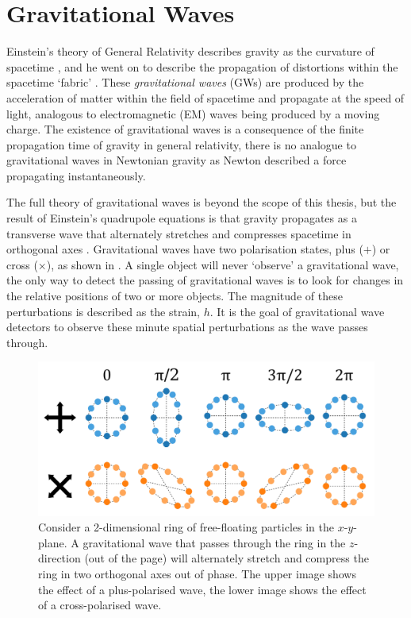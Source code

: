 \section{Gravitational Waves}
\label{sec:gw}
\begin{colsection}


\begin{colsection}

Einstein's theory of General Relativity describes gravity as the curvature of spacetime \citep{Einstein1914}, and he went on to describe the propagation of distortions within the spacetime `fabric' \citep{Einstein1916}. These \emph{gravitational waves} (GWs) are produced by the acceleration of matter within the field of spacetime and propagate at the speed of light, analogous to electromagnetic (EM) waves being produced by a moving charge. The existence of gravitational waves is a consequence of the finite propagation time of gravity in general relativity, there is no analogue to gravitational waves in Newtonian gravity as Newton described a force propagating instantaneously.

The full theory of gravitational waves is beyond the scope of this thesis, but the result of Einstein's quadrupole equations is that gravity propagates as a transverse wave that alternately stretches and compresses spacetime in orthogonal axes \citep{BIGcardiff}. Gravitational waves have two polarisation states, plus ($+$) or cross ($\times$), as shown in . A single object will never `observe' a gravitational wave, the only way to detect the passing of gravitational waves is to look for changes in the relative positions of two or more objects. The magnitude of these perturbations is described as the strain, $h$. It is the goal of gravitational wave detectors to observe these minute spatial perturbations as the wave passes through.

\begin{figure}[t]
    \begin{center}
        \includegraphics[width=0.8\linewidth]{images/waveimg2.pdf}
    \end{center}
    \caption[Gravitational wave polarisations]{
        Consider a 2-dimensional ring of free-floating particles in the $x$-$y$-plane. A gravitational wave that passes through the ring in the $z$-direction (out of the page) will alternately stretch and compress the ring in two orthogonal axes out of phase. The upper image shows the effect of a plus-polarised wave, the lower image shows the effect of a cross-polarised wave.
        }\label{fig:wave}
\end{figure}


\end{colsection}
\end{colsection}
